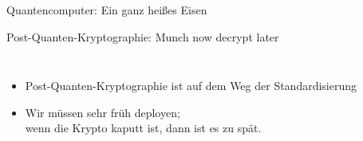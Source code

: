 \documentclass[german]{rosenpass-beamer}
\begin{document}
\begin{frame}{Quantencomputer: Ein ganz heißes Eisen}
\end{frame}

\begin{frame}{Post-Quanten-Kryptographie: Munch now decrypt later}
\begin{columns}[c]
\begin{itemize}
    \item Post-Quanten-Kryptographie ist auf dem Weg der Standardisierung
    \item Wir müssen sehr früh deployen;\\
    wenn die Krypto kaputt ist, dann ist es zu spät.
\end{itemize}
  
  \footnotemark
\end{columns}
\end{frame}
\end{document}
